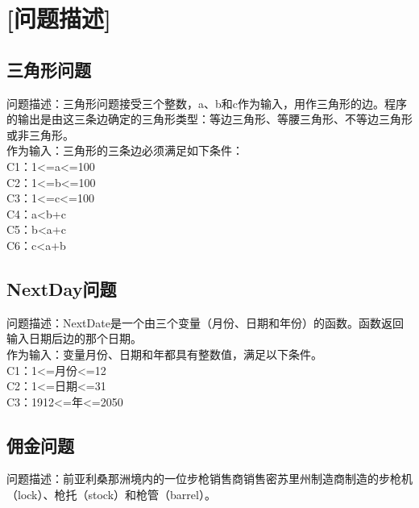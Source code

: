 \documentclass{article}
\begin{document}
\section{[问题描述]}
\subsection{三角形问题}

问题描述：三角形问题接受三个整数，a、b和c作为输入，用作三角形的边。程序的输出是由这三条边确定的三角形类型：等边三角形、等腰三角形、不等边三角形或非三角形。\\

作为输入：三角形的三条边必须满足如下条件：\\

C1：1<=a<=100\\

C2：1<=b<=100\\

C3：1<=c<=100\\

C4：a<b+c\\

C5：b<a+c\\

C6：c<a+b\\

\subsection{NextDay问题}

问题描述：NextDate是一个由三个变量（月份、日期和年份）的函数。函数返回输入日期后边的那个日期。\\

作为输入：变量月份、日期和年都具有整数值，满足以下条件。\\

C1：1<=月份<=12\\

C2：1<=日期<=31\\

C3：1912<=年<=2050\\

\subsection{佣金问题}

问题描述：前亚利桑那洲境内的一位步枪销售商销售密苏里州制造商制造的步枪机（lock）、枪托（stock）和枪管（barrel）。\\
\end{document}
